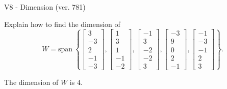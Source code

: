 \begin{exercise}
  \begin{exerciseTitle}V8 - Dimension (ver. 781)\end{exerciseTitle}
  \begin{exerciseStatement}
    Explain how to find the dimension of 
\[W=\mathrm{span}\ \left\{\left[\begin{array}{r}
3 \\
-3 \\
2 \\
-1 \\
-3
\end{array}\right] , \left[\begin{array}{r}
1 \\
3 \\
1 \\
-1 \\
-2
\end{array}\right] , \left[\begin{array}{r}
-1 \\
3 \\
-2 \\
-2 \\
3
\end{array}\right] , \left[\begin{array}{r}
-3 \\
9 \\
0 \\
2 \\
-1
\end{array}\right] , \left[\begin{array}{r}
-1 \\
-3 \\
-1 \\
2 \\
3
\end{array}\right]\right\}.\]



  \end{exerciseStatement}
  \begin{exerciseAnswer}
   The dimension of \(W\) is  \(4\).
  


  \end{exerciseAnswer}
\end{exercise}